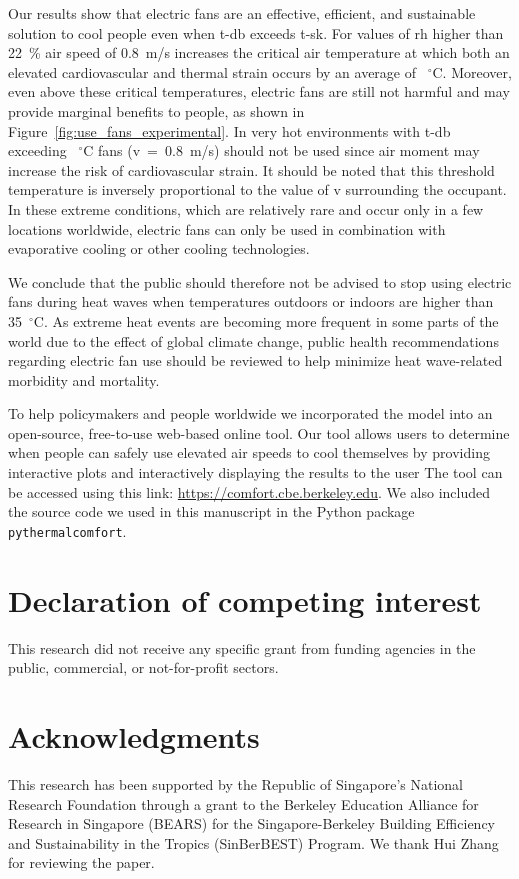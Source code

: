 Our results show that electric fans are an effective, efficient, and sustainable solution to cool people even when \ac{t-db} exceeds \ac{t-sk}.
For values of \ac{rh} higher than 22~\% air speed of 0.8~m/s increases the critical air temperature at which both an elevated cardiovascular and thermal strain occurs by an average of ~$^{\circ}$C\@.
Moreover, even above these critical temperatures, electric fans are still not harmful and may provide marginal benefits to people, as shown in Figure~\ref{fig:use_fans_experimental}.
In very hot environments with \ac{t-db} exceeding ~$^{\circ}$C fans (\acf{v}~=~0.8~m/s) should not be used since air moment may increase the risk of cardiovascular strain.
It should be noted that this threshold temperature is inversely proportional to the value of \ac{v} surrounding the occupant.
In these extreme conditions, which are relatively rare and occur only in a few locations worldwide, electric fans can only be used in combination with evaporative cooling or other cooling technologies.

We conclude that the public should therefore not be advised to stop using electric fans during heat waves when temperatures outdoors or indoors are higher than 35~$^{\circ}$C\@.
As extreme heat events are becoming more frequent in some parts of the world due to the effect of global climate change, public health recommendations regarding electric fan use should be reviewed to help minimize heat wave-related morbidity and mortality.

To help policymakers and people worldwide we incorporated the model into an open-source, free-to-use web-based online tool.
Our tool allows users to determine when people can safely use elevated air speeds to cool themselves by providing interactive plots and interactively displaying the results to the user
The tool can be accessed using this link: \url{https://comfort.cbe.berkeley.edu}.
We also included the source code we used in this manuscript in the Python package \verb|pythermalcomfort|.

\section{Declaration of competing interest}\label{sec:declaration-of-competing-interest}
This research did not receive any specific grant from funding agencies in the public, commercial, or not-for-profit sectors.

\section{Acknowledgments}\label{sec:acknowledgments}
This research has been supported by the Republic of Singapore's National Research Foundation through a grant to the Berkeley Education Alliance for Research in Singapore (BEARS) for the Singapore-Berkeley Building Efficiency and Sustainability in the Tropics (SinBerBEST) Program.
We thank Hui Zhang for reviewing the paper.